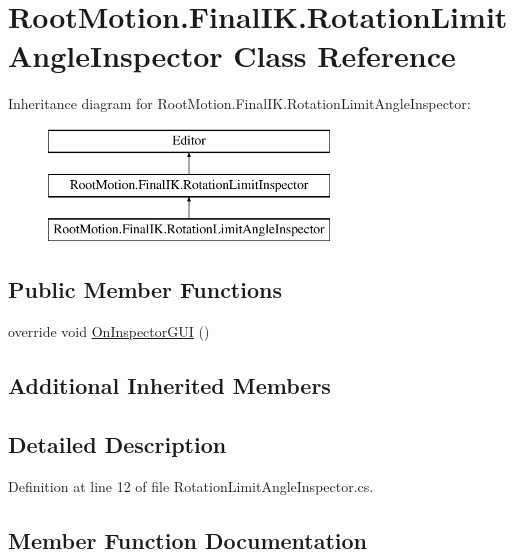 \hypertarget{class_root_motion_1_1_final_i_k_1_1_rotation_limit_angle_inspector}{}\section{Root\+Motion.\+Final\+I\+K.\+Rotation\+Limit\+Angle\+Inspector Class Reference}
\label{class_root_motion_1_1_final_i_k_1_1_rotation_limit_angle_inspector}
Inheritance diagram for Root\+Motion.\+Final\+I\+K.\+Rotation\+Limit\+Angle\+Inspector\+:\begin{figure}[H]
\begin{center}
\leavevmode
\includegraphics[height=3.000000cm]{class_root_motion_1_1_final_i_k_1_1_rotation_limit_angle_inspector}
\end{center}
\end{figure}
\subsection*{Public Member Functions}
\begin{DoxyCompactItemize}
\item 
override void \mbox{\hyperlink{class_root_motion_1_1_final_i_k_1_1_rotation_limit_angle_inspector_aeb9920079f617e8a9aafcb8859964297}{On\+Inspector\+G\+UI}} ()
\end{DoxyCompactItemize}
\subsection*{Additional Inherited Members}


\subsection{Detailed Description}


Definition at line 12 of file Rotation\+Limit\+Angle\+Inspector.\+cs.



\subsection{Member Function Documentation}
\mbox{\label{class_root_motion_1_1_final_i_k_1_1_rotation_limit_angle_inspector_aeb9920079f617e8a9aafcb8859964297}} 
